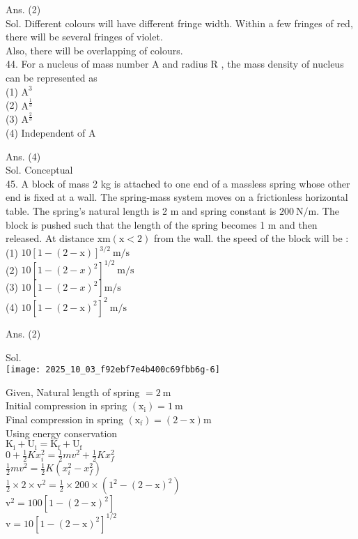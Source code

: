 \documentclass[10pt]{article}
\begin{document}
Ans. (2)\\
Sol. Different colours will have different fringe width. Within a few fringes of red, there will be several fringes of violet.\\
Also, there will be overlapping of colours.\\
44. For a nucleus of mass number A and radius R , the mass density of nucleus can be represented as\\
(1) \(\mathrm{A}^{3}\)\\
(2) \(\mathrm{A}^{\frac{1}{3}}\)\\
(3) \(\mathrm{A}^{\frac{2}{3}}\)\\
(4) Independent of A

Ans. (4)\\
Sol. Conceptual\\
45. A block of mass 2 kg is attached to one end of a massless spring whose other end is fixed at a wall. The spring-mass system moves on a frictionless horizontal table. The spring's natural length is 2 m and spring constant is \(200 \mathrm{~N} / \mathrm{m}\). The block is pushed such that the length of the spring becomes 1 m and then released. At distance \(\mathrm{x} \mathrm{m}(\mathrm{x}<2)\) from the wall. the speed of the block will be :\\
(1) \(10[1-(2-\mathrm{x})]^{3 / 2} \mathrm{~m} / \mathrm{s}\)\\
(2) \(10\left[1-(2-x)^{2}\right]^{1 / 2} \mathrm{~m} / \mathrm{s}\)\\
(3) \(10\left[1-(2-x)^{2}\right] \mathrm{m} / \mathrm{s}\)\\
(4) \(10\left[1-(2-\mathrm{x})^{2}\right]^{2} \mathrm{~m} / \mathrm{s}\)

Ans. (2)

Sol.\\
\texttt{[image: 2025\_10\_03\_f92ebf7e4b400c69fbb6g-6]}

Given, Natural length of spring \(=2 \mathrm{~m}\)\\
Initial compression in spring \(\left(\mathrm{x}_{\mathrm{i}}\right)=1 \mathrm{~m}\)\\
Final compression in spring \(\left(\mathrm{x}_{\mathrm{f}}\right)=(2-\mathrm{x}) \mathrm{m}\)\\
Using energy conservation\\
\(\mathrm{K}_{\mathrm{i}}+\mathrm{U}_{\mathrm{i}}=\mathrm{K}_{\mathrm{f}}+\mathrm{U}_{\mathrm{f}}\)\\
\(0+\frac{1}{2} K x_{i}^{2}=\frac{1}{2} m v^{2}+\frac{1}{2} K x_{f}^{2}\)\\
\(\frac{1}{2} m v^{2}=\frac{1}{2} K\left(x_{i}^{2}-x_{f}^{2}\right)\)\\
\(\frac{1}{2} \times 2 \times \mathrm{v}^{2}=\frac{1}{2} \times 200 \times\left(1^{2}-(2-\mathrm{x})^{2}\right)\)\\
\(\mathrm{v}^{2}=100\left[1-(2-\mathrm{x})^{2}\right]\)\\
\(\mathrm{v}=10\left[1-(2-\mathrm{x})^{2}\right]^{1 / 2}\)
\end{document}
